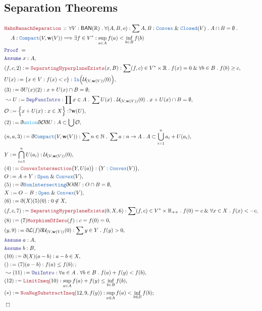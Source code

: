 \documentclass[12pt]{scrartcl}
\newcommand{\TYPE}[1]{\textcolor{NavyBlue}{\mathtt{#1}}}
\newcommand{\FUNC}[1]{\textcolor{Cerulean}{\mathtt{#1}}}
\newcommand{\LOGIC}[1]{\textcolor{Blue}{\mathtt{#1}}}
\newcommand{\THM}[1]{\textcolor{Maroon}{\mathtt{#1}}}
\renewcommand{\.}{\; . \;}
\newcommand{\de}{: \kern 0.1pc =}
\newcommand{\Theorem}[2]{& \THM{#1} \, :: \, #2 \\ & \Proof = \\ }
\newcommand{\NewLine}{\\ & \kern 1pc}
\newcommand{\Page}[1]{\begin{align*} #1 \end{align*} \newpage   }
\newcommand{ \bd }{ \ByDef }
\renewcommand{\And}{\; \& \;}
\newcommand{\Reals}{\mathbb{R} }
\newcommand{\Nat}{\mathbb{N} }
\newcommand{\Say}[3]{& #1 \de #2 : #3, \\}
\newcommand{\Conclude}[3]{& #1 \de #2 : #3; \\}
\newcommand{\Derive}[3]{& \leadsto #1 \de #2 : #3, \\}
\newcommand{\A}{\LOGIC{Assume} \;}
\newcommand{\Assume}[2]{& \A #1 : #2, \\}
\newcommand{\QED}{\; \square}
\newcommand{\EndProof}{& \QED \\}
\newcommand{\ByDef}{\eth}
\newcommand{\Proof}{\LOGIC{Proof} \; }
\newcommand{\BAN}{\textsf{BAN}}
\begin{document}
 \subsection{Separation Theorems}
 \Page{
 \Theorem{HahnBanachSeparation}{ \forall V : \BAN(\Reals) \. \forall (A,B,o) : \sum A, B  : \TYPE{Convex} \And \TYPE{Closed}(V) \.    A \cap B = \emptyset \. \NewLine  
  A : \TYPE{Compact}(V,\mathbf{w}(V)) \Longrightarrow \exists f \in V^* : \sup_{a \in A} f(a) <  \inf_{b \in B} f(b)
 }
 \Assume{x}{A}
 \Say{(f,c,2)}{\THM{SeparatingHyperplaneExists}(x,B)}{\sum (f,c) \in V^* \times \Reals \. f(x) = 0 \And  \forall b \in B \. f(b) \ge c}
 \Say{U(x)}{ \{ x \in  V : f(x) < c   \}}{\TYPE{In}\Big(\mathcal{U}_{(V,\mathbf{w}(V))}(0)\Big)}
 \Conclude{(3)}{\bd U(x)(2) }{ x + U(x) \cap B = \emptyset }
 \Derive{U}{\LOGIC{DepFuncIntro} }{ \prod x \in A \. \sum U(x) \. \mathcal{U}_{(V,\mathbf{w}(V))}(0) \. x + U(x) \cap B = \emptyset }
\Say{\mathcal{O}}{  \Big\{  x + U(x) : x \in X \Big\}}{ ?\mathbf{w}(U)}
\Say{(2)}{\bd \FUNC{union}\bd \mathcal{O} \bd U}{ A \subset \bigcup \mathcal{O}}
\Say{(n,a,3)}{\bd \TYPE{Compact}(V,\mathbf{w}(V))  }{ \sum n \in \Nat \. \sum  a : n \to A \. A \subset \bigcup^n_{i = 1} a_i + U(a_i)  }
\Say{Y}{\bigcap^n_{i = 1} U(a_i)}{\mathcal{U}_{(V,\mathbf{w}(V))}(0)}
\Say{(4)}{\THM{ConvexIntersection}\big(Y,U(a)\big)}{\big(Y : \TYPE{Convex}(V)\big)}
\Say{O}{ A + Y}{\TYPE{Open} \And \TYPE{Convex}(V)}
\Say{(5)}{\bd \TYPE{NonIntersecting} \bd O \bd U}{ O \cap B = \emptyset }
\Say{X}{O - B}{\TYPE{Open} \And \TYPE{Convex}(V)}
\Say{(6)}{\bd(X)(5)(0)}{0 \not \in X}
\Say{(f,c,7)}{\THM{SeparatingHyperplaneExists}(0,X,6)}{\sum (f,c) \in V^* \times \Reals_{++} \. f(0) = c \And  \forall x \in X  \. f(x) < -c}
\Say{(8)}{(7)\THM{MorphismOfZero}(f)}{c = f(0) = 0}
\Say{(y,9)}{\bd \mathcal{L}(f)\bd \mathcal{U}_{(V,\mathbf{w}(V))}(0) }{ \sum y \in Y \. f(y) > 0}
\Assume{a}{A}
\Assume{b}{B}
\Say{ (10)}{\bd(X)(a -b)}{ a - b \in X}
\Conclude{()}{(7)(a - b)}{ f(a) \le f(b);}
\Derive{(11)}{\LOGIC{UniIntro}}{\forall a \in A \. \forall b \in B \. f(a) + f(y) < f(b)}
\Say{(12)}{\THM{LimitIneq}(10)}{\sup_{a \in A} f(a) + f(y) \le   \inf_{b \in B} f(b)}
\Conclude{(*)}{ \THM{NonNegSubstractIneq}(12,9,f(y))}{ \sup_{a \in A} f(a) < \inf_{b \in B} f(b)   }
\EndProof
}
\end{document}

